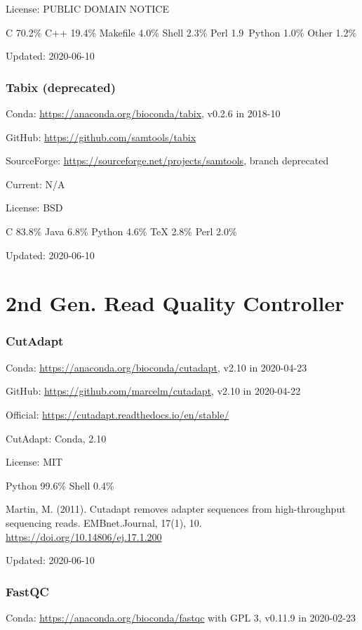 \documentclass[]{article}
\begin{document}
License: PUBLIC DOMAIN NOTICE

C 70.2\% C++ 19.4\% Makefile 4.0\% Shell 2.3\% Perl 1.9\ Python 1.0\% Other 1.2\%

Updated: 2020-06-10

\section{Tabix (deprecated)}

Conda: \url{https://anaconda.org/bioconda/tabix}, v0.2.6 in 2018-10

GitHub: \url{https://github.com/samtools/tabix}

SourceForge: \url{https://sourceforge.net/projects/samtools}, branch deprecated

Current: N/A

License: BSD

C 83.8\% Java 6.8\% Python 4.6\% TeX 2.8\% Perl 2.0\%

Updated: 2020-06-10

\part{2nd Gen. Read Quality Controller}

\section{CutAdapt}

Conda: \url{https://anaconda.org/bioconda/cutadapt}, v2.10 in 2020-04-23

GitHub: \url{https://github.com/marcelm/cutadapt}, v2.10 in 2020-04-22

Official: \url{https://cutadapt.readthedocs.io/en/stable/}

CutAdapt: Conda, 2.10

License: MIT

Python 99.6\% Shell 0.4\%

Martin, M. (2011). Cutadapt removes adapter sequences from high-throughput sequencing reads. EMBnet.Journal, 17(1), 10. \url{https://doi.org/10.14806/ej.17.1.200}

Updated: 2020-06-10

\section{FastQC}

Conda: \url{https://anaconda.org/bioconda/fastqc} with GPL 3, v0.11.9 in 2020-02-23
\end{document}
